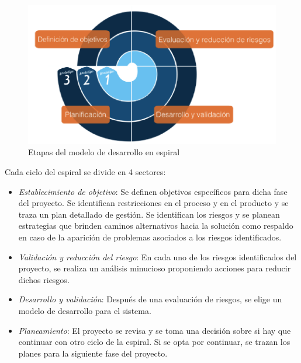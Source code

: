 \begin{figure}[h!]
 \begin{center}
  \includegraphics[width=1\textwidth,keepaspectratio=true]{./images/ESPIRAL}
  \caption{Etapas del modelo de desarrollo en espiral}
  \label{fig:esquema}
 \end{center}
\end{figure}

Cada ciclo del espiral se divide en 4 sectores:
\begin {itemize}
\item \textit{Establecimiento de objetivo}: Se definen objetivos
  específicos para dicha fase del proyecto. Se identifican
  restricciones en el proceso y en el producto y se traza un plan
  detallado de gestión. Se identifican los riesgos y se planean
  estrategias que brinden caminos alternativos hacia la solución como
  respaldo en caso de la aparición de problemas asociados a los
  riesgos identificados.
\item \textit{Validación y reducción del riesgo}: En cada uno de los
  riesgos identificados del proyecto, se realiza un análisis
  minucioso proponiendo acciones para reducir dichos riesgos.
\item \textit{Desarrollo y validación}: Después de una evaluación de
  riesgos, se elige un modelo de desarrollo para el sistema.
\item \textit{Planeamiento}: El proyecto se revisa y se toma una
  decisión sobre si hay que continuar con otro ciclo de la espiral. Si
  se opta por continuar, se trazan los planes para la siguiente fase
  del proyecto.
\end {itemize}

